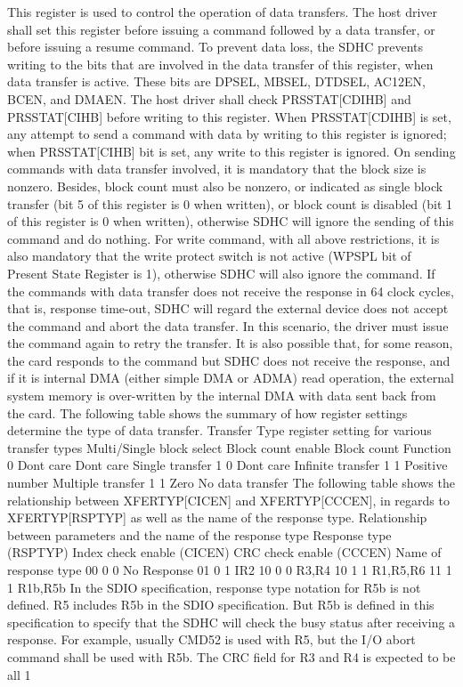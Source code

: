 This register is used to control the operation of data transfers. The host driver shall set this register before issuing a command followed by a data transfer, or before issuing a resume command. To prevent data loss, the S\+D\+HC prevents writing to the bits that are involved in the data transfer of this register, when data transfer is active. These bits are D\+P\+S\+EL, M\+B\+S\+EL, D\+T\+D\+S\+EL, A\+C12\+EN, B\+C\+EN, and D\+M\+A\+EN. The host driver shall check P\+R\+S\+S\+T\+AT\mbox{[}C\+D\+I\+HB\mbox{]} and P\+R\+S\+S\+T\+AT\mbox{[}C\+I\+HB\mbox{]} before writing to this register. When P\+R\+S\+S\+T\+AT\mbox{[}C\+D\+I\+HB\mbox{]} is set, any attempt to send a command with data by writing to this register is ignored; when P\+R\+S\+S\+T\+AT\mbox{[}C\+I\+HB\mbox{]} bit is set, any write to this register is ignored. On sending commands with data transfer involved, it is mandatory that the block size is nonzero. Besides, block count must also be nonzero, or indicated as single block transfer (bit 5 of this register is 0 when written), or block count is disabled (bit 1 of this register is 0 when written), otherwise S\+D\+HC will ignore the sending of this command and do nothing. For write command, with all above restrictions, it is also mandatory that the write protect switch is not active (W\+P\+S\+PL bit of Present State Register is 1), otherwise S\+D\+HC will also ignore the command. If the commands with data transfer does not receive the response in 64 clock cycles, that is, response time-\/out, S\+D\+HC will regard the external device does not accept the command and abort the data transfer. In this scenario, the driver must issue the command again to retry the transfer. It is also possible that, for some reason, the card responds to the command but S\+D\+HC does not receive the response, and if it is internal D\+MA (either simple D\+MA or A\+D\+MA) read operation, the external system memory is over-\/written by the internal D\+MA with data sent back from the card. The following table shows the summary of how register settings determine the type of data transfer. Transfer Type register setting for various transfer types Multi/\+Single block select Block count enable Block count Function 0 Don\textquotesingle{}t care Don\textquotesingle{}t care Single transfer 1 0 Don\textquotesingle{}t care Infinite transfer 1 1 Positive number Multiple transfer 1 1 Zero No data transfer The following table shows the relationship between X\+F\+E\+R\+T\+YP\mbox{[}C\+I\+C\+EN\mbox{]} and X\+F\+E\+R\+T\+YP\mbox{[}C\+C\+C\+EN\mbox{]}, in regards to X\+F\+E\+R\+T\+YP\mbox{[}R\+S\+P\+T\+YP\mbox{]} as well as the name of the response type. Relationship between parameters and the name of the response type Response type (R\+S\+P\+T\+YP) Index check enable (C\+I\+C\+EN) C\+RC check enable (C\+C\+C\+EN) Name of response type 00 0 0 No Response 01 0 1 I\+R2 10 0 0 R3,R4 10 1 1 R1,R5,R6 11 1 1 R1b,R5b In the S\+D\+IO specification, response type notation for R5b is not defined. R5 includes R5b in the S\+D\+IO specification. But R5b is defined in this specification to specify that the S\+D\+HC will check the busy status after receiving a response. For example, usually C\+M\+D52 is used with R5, but the I/O abort command shall be used with R5b. The C\+RC field for R3 and R4 is expected to be all 1 